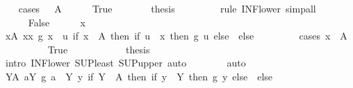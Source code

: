 \begin{isabellebody}
\ \ \isamarkupfalse%
\ {\isacharparenleft}{\kern0pt}cases\ {\isachardoublequoteopen}{\isacharbraceleft}{\kern0pt}{\isacharbraceright}{\kern0pt}\ {\isasymin}\ A{\isachardoublequoteclose}{\isacharparenright}{\kern0pt}\isanewline
\ \ \ \ \isamarkupfalse%
\ True\isanewline
\ \ \ \ \isamarkupfalse%
\ \isamarkupfalse%
\ {\isacharquery}{\kern0pt}thesis\ \isanewline
\ \ \ \ \ \ \isamarkupfalse%
\ {\isacharparenleft}{\kern0pt}rule\ INF{\isacharunderscore}{\kern0pt}lower{}{\isacharparenright}{\kern0pt}\ simp{\isacharunderscore}{\kern0pt}all\isanewline
\ \ \isamarkupfalse%
\isanewline
\ \ \ \ \isamarkupfalse%
\ False\isanewline
\ \ \ \ \isacommand{{\isacharbraceleft}{\kern0pt}}\isamarkupfalse%
\isamarkupfalse%
\ x\isanewline
\ \ \ \ \ \ \isamarkupfalse%
\ {\isachardoublequoteopen}{\isacharparenleft}{\kern0pt}{\isasymSqinter}x{\isasymin}A{\isachardot}{\kern0pt}\ {\isasymSqunion}x{\isasymin}x{\isachardot}{\kern0pt}\ g\ x{\isacharparenright}{\kern0pt}\ {\isasymle}\ {\isacharparenleft}{\kern0pt}{\isasymSqunion}u{\isachardot}{\kern0pt}\ if\ x\ {\isasymin}\ A\ then\ if\ u\ {\isasymin}\ x\ then\ g\ u\ else\ {\isasymbottom}\ else\ {\isasymtop}{\isacharparenright}{\kern0pt}{\isachardoublequoteclose}\isanewline
\ \ \ \ \ \ \isamarkupfalse%
\ {\isacharparenleft}{\kern0pt}cases\ {\isachardoublequoteopen}x\ {\isasymin}\ A{\isachardoublequoteclose}{\isacharparenright}{\kern0pt}\isanewline
\ \ \ \ \ \ \ \ \isamarkupfalse%
\ True\isanewline
\ \ \ \ \ \ \ \ \isamarkupfalse%
\ \isamarkupfalse%
\ {\isacharquery}{\kern0pt}thesis\isanewline
\ \ \ \ \ \ \ \ \ \ \isamarkupfalse%
\ {\isacharparenleft}{\kern0pt}intro\ INF{\isacharunderscore}{\kern0pt}lower{}\ SUP{\isacharunderscore}{\kern0pt}least\ SUP{\isacharunderscore}{\kern0pt}upper{}{\isacharparenright}{\kern0pt}\ auto\isanewline
\ \ \ \ \ \ \isamarkupfalse%
\ auto\isanewline
\ \ \ \ \isacommand{{\isacharbraceright}{\kern0pt}}\isamarkupfalse%
\isanewline
\ \ \ \ \isamarkupfalse%
\ \isamarkupfalse%
\ {\isachardoublequoteopen}{\isacharparenleft}{\kern0pt}{\isasymSqinter}Y{\isasymin}A{\isachardot}{\kern0pt}\ {\isasymSqunion}a{\isasymin}Y{\isachardot}{\kern0pt}\ g\ a{\isacharparenright}{\kern0pt}\ {\isasymle}\ {\isacharparenleft}{\kern0pt}{\isasymSqinter}Y{\isachardot}{\kern0pt}\ {\isasymSqunion}y{\isachardot}{\kern0pt}\ if\ Y\ {\isasymin}\ A\ then\ if\ y\ {\isasymin}\ Y\ then\ g\ y\ else\ {\isasymbottom}\ else\ {\isasymtop}{\isacharparenright}{\kern0pt}{\isachardoublequoteclose}\isanewline

\end{isabellebody}

